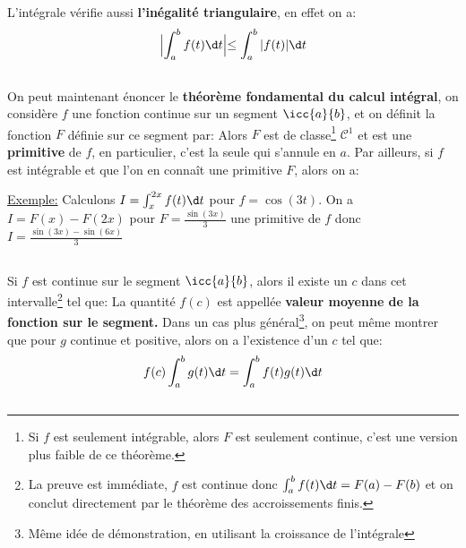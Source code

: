 L'intégrale vérifie aussi \textbf{l'inégalité triangulaire}, en effet on a:
\[ 
   \Bigl| \int_{a}^{b} f(t) \d t \Bigl| \leq \int_{a}^{b} |f(t)| \d t 
\]
  

\subsection*{}

On peut maintenant énoncer le \textbf{théorème fondamental du calcul intégral}, on considère \(f\) une fonction continue sur un segment \(\icc{a}{b}\), et on définit la fonction \(F\) définie sur ce segment par:
Alors \(F\) est de classe\footnote[4]{Si \(f\) est seulement intégrable, alors \(F\) est seulement continue, c'est une version plus faible de ce théorème.} \(\mathscr{C}^1\) et est une \textbf{primitive} de \(f\), en particulier, c'est la seule qui s'annule en \(a\).\+
Par ailleurs, si \(f\) est intégrable et que l'on en connaît une primitive \(F\), alors on a:

\underline{Exemple:} Calculons \(I = \int_{x}^{2x} f(t) \d t\) pour \(f = \cos(3t)\). On a \(I = F(x) - F(2x)\) pour \(F = \frac{\sin(3x)}{3}\) une primitive de \(f\) donc \(I = \frac{\sin(3x) - \sin(6x)}{3}\)

\subsection*{}
Si \(f\) est continue sur le segment \(\icc{a}{b}\), alors il existe un \(c\) dans cet intervalle\footnote[1]{La preuve est immédiate, \(f\) est continue donc \(\int_{a}^{b} f(t) \d t = F(a) - F(b)\) et on conclut directement par le théorème des accroissements finis.} tel que:
La quantité \(f(c)\) est appellée \textbf{valeur moyenne de la fonction sur le segment.}
Dans un cas plus général\footnote[2]{Même idée de démonstration, en utilisant la croissance de l'intégrale}, on peut même montrer que pour \(g\) continue et positive, alors on a l'existence d'un \(c\) tel que:
\[
   f(c)\int_{a}^{b} g(t) \d t = \int_{a}^{b} f(t)g(t) \d t
\]

\subsection*{}

